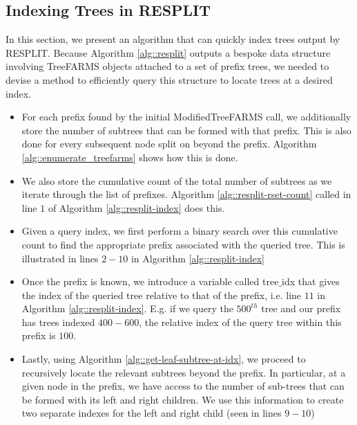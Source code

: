 \subsection{Indexing Trees in RESPLIT }\label{sec:resplit_indexing}
In this section, we present an algorithm that can quickly index trees output by RESPLIT. Because Algorithm \ref{alg::resplit} outputs a bespoke data structure involving TreeFARMS objects attached to a set of prefix trees, we needed to devise a method to efficiently query this structure to locate trees at a desired index. 
\begin{itemize}
    \item For each prefix found by the initial ModifiedTreeFARMS call, we additionally store the number of subtrees that can be formed with that prefix. This is also done for every subsequent node split on beyond the prefix. Algorithm \ref{alg::enumerate_treefarms} shows how this is done. 
    \item We also store the cumulative count of the total number of subtrees as we iterate through the list of prefixes. Algorithm \ref{alg::resplit-rset-count} called in line $1$ of Algorithm \ref{alg::resplit-index} does this. 
    \item Given a query index, we first perform a binary search over this cumulative count to find the appropriate prefix associated with the queried tree. This is illustrated in lines $2-10$ in Algorithm \ref{alg::resplit-index}
    \item Once the prefix is known, we introduce a variable called tree$\_$idx that gives the index of the queried tree relative to that of the prefix, i.e. line $11$ in Algorithm \ref{alg::resplit-index}. E.g. if we query the $500^{th}$ tree and our prefix has trees indexed $400-600$, the relative index of the query tree within this prefix is $100$. 
    \item Lastly, using Algorithm \ref{alg::get-leaf-subtree-at-idx}, we proceed to recursively locate the relevant subtrees beyond the prefix. In particular, at a given node in the prefix, we have access to the number of sub-trees that can be formed with its left and right children. We use this information to create two separate indexes for the left and right child (seen in lines $9-10$)
\end{itemize}
